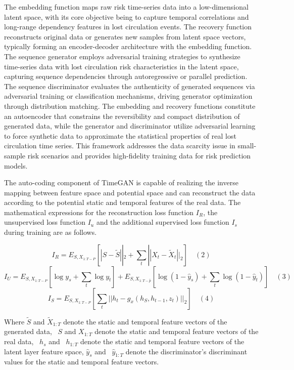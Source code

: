 \documentclass[journal,article,submit,pdftex,moreauthors]{Definitions/mdpi}
\begin{document}
The embedding function maps raw risk time-series data into a low-dimensional latent space, with its core objective being to capture temporal correlations and long-range dependency features in lost circulation events. The recovery function reconstructs original data or generates new samples from latent space vectors, typically forming an encoder-decoder architecture with the embedding function. The sequence generator employs adversarial training strategies to synthesize time-series data with lost circulation risk characteristics in the latent space, capturing sequence dependencies through autoregressive or parallel prediction. The sequence discriminator evaluates the authenticity of generated sequences via adversarial training or classification mechanisms, driving generator optimization through distribution matching. The embedding and recovery functions constitute an autoencoder that constrains the reversibility and compact distribution of generated data, while the generator and discriminator utilize adversarial learning to force synthetic data to approximate the statistical properties of real lost circulation time series. This framework addresses the data scarcity issue in small-sample risk scenarios and provides high-fidelity training data for risk prediction models.



The auto-coding component of TimeGAN is capable of realizing the inverse mapping between feature space and potential space and can reconstruct the data according to the potential static and temporal features of the real data. The mathematical expressions for the reconstruction loss function \({{I}_{R}}\), the unsupervised loss function \({{I}_{u}}\) and the additional supervised loss function \({{I}_{s}}\) during training are as follows.

$$ I _ { R } = E _ { S , X _ { 1: T - P } } \left[ | S - \tilde { S } | | _ { 2 } + \sum _ { t } | | X _ { t } - \tilde { X } _ { t } | | _ { 2 } \right]\quad (2)$$
$$ I _ { U } = E _ { S , X _ {1: T- P } } \left[ \log y _ { s } + \sum _ { t } \log y _ { t } \right] + E _ { S , X _ { 1: T - \widehat { p } } } \left[ \log ( 1 - \widehat { y } _ { s } ) + \sum _ { t } \log ( 1 - \widehat { y } _ { t } ) \right]\quad (3)$$
$$ I _ { S } = E _ { S , X _ { 1: T - P } } \left[ \sum _ { t } | | h _ { t } - g _ { x } ( h _ { S } , h _ { t - 1 } , z _ { t } ) | | _ { 2 } \right]\quad (4)$$

Where \({{\widetilde{S}}}\) and \({{\widetilde{X}}_{1:T}}\) denote the static and temporal feature vectors of the generated data,  \({S}\) and \({X}_{1:T}\) denote the static and temporal feature vectors of the real data,  \({h}_{s}\) and  \({h}_{1:T}\) denote the static and temporal feature vectors of the latent layer feature space, \({{\widehat{y}}_{s}}\) and  \({{\widehat{y}}_{1:T}}\) denote the discriminator's discriminant values for the static and temporal feature vectors.
\end{document}

